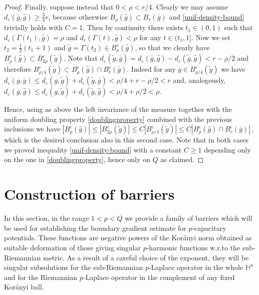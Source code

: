 \documentclass[10pt]{amsart}
\numberwithin{equation}{section}
\theoremstyle{definition}
\begin{document}
\begin{proof}
Finally, suppose instead that $0<\rho< r/4$. Clearly we may assume $d_\varepsilon(\bar{g},\hat{g}) \geq \frac34 r$, because otherwise $B_\rho(\hat{g}) \subset B_r(\bar{g})$ and \eqref{unif-density-bound} trivially holds with $C=1$. Then by continuity there exists $t_1 \in (0,1)$ such that $d_\varepsilon(\Gamma(t_1),\hat{g})=\rho$ and $d_\varepsilon(\Gamma(t),\hat{g})<\rho$ for any $t \in (t_1,1]$. Now we set $t_2=\frac12 (t_1+1)$ and $\tilde{g}=\Gamma(t_2) \in B^\varepsilon_\rho(\hat{g})$, so that we clearly have $B^\varepsilon_\rho(\hat{g}) \subset B^\varepsilon_{2\rho}(\tilde{g})$. Note that $d_\varepsilon(\tilde{g},\bar{g})=d_\varepsilon(\bar{g},\hat{g})-d_\varepsilon(\tilde{g},\hat{g})<r-\rho/2$ and therefore $B^\varepsilon_{\rho/{4}}(\tilde{g}) \subset B^\varepsilon_\rho(\hat{g}) \cap B^\varepsilon_r(\bar{g}) $. Indeed  for any $g \in B^\varepsilon_{\rho/4}(\tilde{g})$ we have $d_\varepsilon(g,\bar{g}) \leq d_\varepsilon(g, \tilde{g})+d_\varepsilon(\tilde{g},\bar{g})<\rho/4+r-\rho/2 <r$ and, analogously,  $d_\varepsilon(g,\hat{g}) \leq d_\varepsilon(g, \tilde{g})+d_\varepsilon(\tilde{g},\hat{g})<\rho/4+\rho/2< \rho$. 

Hence, using as above the left invariance of the measure together with the uniform doubling property \eqref{doublingproperty} combined with the previous inclusions we have
$ |B^\varepsilon_\rho(\hat{g})|\leq |B^\varepsilon_{2\rho}(\tilde{g})|\leq C |B^\varepsilon_{\rho/4}(\tilde{g})| \leq C  |B^\varepsilon_\rho(\hat{g}) \cap B^\varepsilon_r(\bar{g})| \, , $
which is the desired conclusion also in this second case. Note that in both cases we proved inequality \eqref{unif-density-bound} with a constant $C\geq 1$ depending only on the one in \eqref{doublingproperty}, hence only on $Q$ as claimed. 
\end{proof}

\medskip







\section{Construction of barriers}
In this section, in the range  $1<p<Q$ we provide a family of barriers which will be used for establishing the boundary gradient estimate for $p$-capacitary potentials. These functions are negative powers of the Kor\'anyi norm obtained as suitable deformation of those giving singular $p$-harmonic functions w.r.to the sub-Riemannian metric. As a result of a careful choice of the exponent, they will be singular subsolutions for the sub-Riemannian $p$-Laplace operator in the whole $\mathbb{H}^n$ and for the Riemannian $p$-Laplace operator in the complement of any fixed Kor\'anyi ball.  
\end{document}
